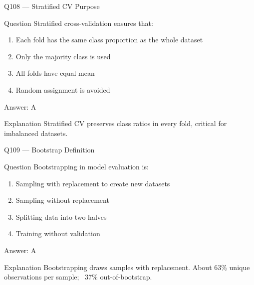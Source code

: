 \documentclass[aspectratio=169,8pt]{beamer}
\begin{document}
	\begin{frame}{Q108 --- Stratified CV Purpose}
		\begin{block}{Question}
			Stratified cross-validation ensures that:
			\begin{enumerate}
				\item Each fold has the same class proportion as the whole dataset
				\item Only the majority class is used
				\item All folds have equal mean
				\item Random assignment is avoided
			\end{enumerate}
		\end{block}
		\begin{exampleblock}{Answer: A}\end{exampleblock}
		\begin{block}{Explanation}
			Stratified CV preserves class ratios in every fold, critical for imbalanced datasets.
		\end{block}
	\end{frame}
	
	\begin{frame}{Q109 --- Bootstrap Definition}
		\begin{block}{Question}
			Bootstrapping in model evaluation is:
			\begin{enumerate}
				\item Sampling with replacement to create new datasets
				\item Sampling without replacement
				\item Splitting data into two halves
				\item Training without validation
			\end{enumerate}
		\end{block}
		\begin{exampleblock}{Answer: A}\end{exampleblock}
		\begin{block}{Explanation}
			Bootstrapping draws samples with replacement. About 63\% unique observations per sample; ~37\% out-of-bootstrap.
		\end{block}
	\end{frame}
	
\end{document}
